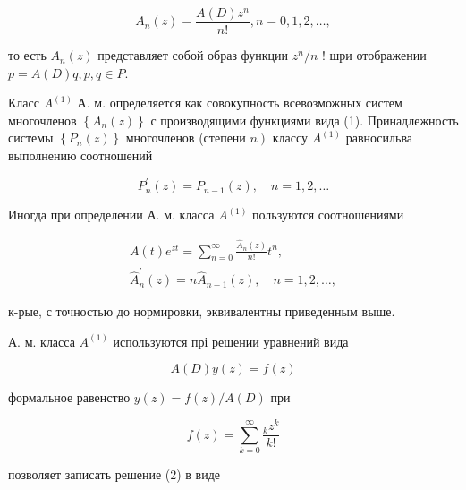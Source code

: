 \documentclass[10pt]{article}
\begin{document}
\[

A_{n}(z)=\frac{A(D) z^{n}}{n !}, n=0,1,2, \ldots,

\]



то есть $A_{n}(z)$ представляет собой образ функции $z^{n} / n$ ! шри отображении $p=A(D) q, p, q \in P$.



Класс $A^{(1)}$ А. м. определяется как совокупность всевозможных систем многочленов $\left\{A_{n}(z)\right\}$ с производящими функциями вида (1). Принадлежность системы $\left\{P_{n}(z)\right\}$ многочленов (степени $\left.n\right)$ классу $A^{(1)}$ равносильва выполнению соотношений



\[

P_{n}^{\prime}(z)=P_{n-1}(z), \quad n=1,2, \ldots

\]



Иногда при определении А. м. класса $A^{(1)}$ пользуются соотношениями



\[

\begin{gathered}

A(t) e^{z t}=\sum_{n=0}^{\infty} \frac{\widehat{A}_{n}(z)}{n !} t^{n}, \\

\widehat{A}_{n}^{\prime}(z)=n \widehat{A}_{n-1}(z), \quad n=1,2, \ldots,

\end{gathered}

\]



к-рые, с точностью до нормировки, эквивалентны приведенным выше.



А. м. класса $A^{(1)}$ используются прі решении уравнений вида



\[

A(D) y(z)=f(z)

\]



формальное равенство $y(z)=f(z) / A(D)$ при



\[

f(z)=\sum_{k=0}^{\infty} \frac{{ }_{k} z^{k}}{k !}

\]



позволяет записать решение (2) в виде
\end{document}
